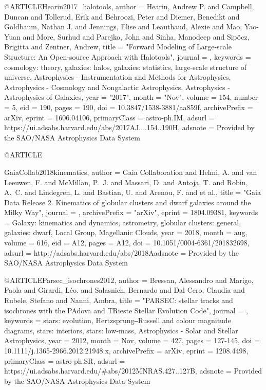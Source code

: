 \documentclass[apj]{emulateapj}
\begin{document}
{@ARTICLE{Hearin2017_halotools,
       author = {{Hearin}, Andrew P. and {Campbell}, Duncan and {Tollerud}, Erik and
         {Behroozi}, Peter and {Diemer}, Benedikt and {Goldbaum}, Nathan J. and
         {Jennings}, Elise and {Leauthaud}, Alexie and {Mao}, Yao-Yuan and
         {More}, Surhud and {Parejko}, John and {Sinha}, Manodeep and
         {Sip{\"o}cz}, Brigitta and {Zentner}, Andrew},
        title = "{Forward Modeling of Large-scale Structure: An Open-source Approach with Halotools}",
      journal = {\aj},
     keywords = {cosmology: theory, galaxies: halos, galaxies: statistics, large-scale structure of universe, Astrophysics - Instrumentation and Methods for Astrophysics, Astrophysics - Cosmology and Nongalactic Astrophysics, Astrophysics - Astrophysics of Galaxies},
         year = "2017",
        month = "Nov",
       volume = {154},
       number = {5},
          eid = {190},
        pages = {190},
          doi = {10.3847/1538-3881/aa859f},
archivePrefix = {arXiv},
       eprint = {1606.04106},
 primaryClass = {astro-ph.IM},
       adsurl = {https://ui.adsabs.harvard.edu/abs/2017AJ....154..190H},
      adsnote = {Provided by the SAO/NASA Astrophysics Data System}
}



@ARTICLE{GaiaCollab2018kinematics,
   author = {{Gaia Collaboration} and {Helmi}, A. and {van Leeuwen}, F. and 
	{McMillan}, P.~J. and {Massari}, D. and {Antoja}, T. and {Robin}, A.~C. and 
	{Lindegren}, L. and {Bastian}, U. and {Arenou}, F. and et al.},
    title = "{Gaia Data Release 2. Kinematics of globular clusters and dwarf galaxies around the Milky Way}",
  journal = {\aap},
archivePrefix = "arXiv",
   eprint = {1804.09381},
 keywords = {Galaxy: kinematics and dynamics, astrometry, globular clusters: general, galaxies: dwarf, Local Group, Magellanic Clouds},
     year = 2018,
    month = aug,
   volume = 616,
      eid = {A12},
    pages = {A12},
      doi = {10.1051/0004-6361/201832698},
   adsurl = {http://adsabs.harvard.edu/abs/2018Aadsnote = {Provided by the SAO/NASA Astrophysics Data System}
}





@ARTICLE{Parsec_isochrones2012,
       author = {{Bressan}, Alessandro and {Marigo}, Paola and {Girardi}, L{\'e}o. and
        {Salasnich}, Bernardo and {Dal Cero}, Claudia and {Rubele},
        Stefano and {Nanni}, Ambra},
        title = "{PARSEC: stellar tracks and isochrones with the PAdova and TRieste Stellar Evolution Code}",
      journal = {\mnras},
     keywords = {stars: evolution, Hertzsprung‒Russell and colour magnitude diagrams, stars: interiors, stars: low-mass, Astrophysics - Solar and Stellar Astrophysics},
         year = 2012,
        month = Nov,
       volume = {427},
        pages = {127-145},
          doi = {10.1111/j.1365-2966.2012.21948.x},
archivePrefix = {arXiv},
       eprint = {1208.4498},
 primaryClass = {astro-ph.SR},
       adsurl = {https://ui.adsabs.harvard.edu/\#abs/2012MNRAS.427..127B},
      adsnote = {Provided by the SAO/NASA Astrophysics Data System}
}



}}
\end{document}
